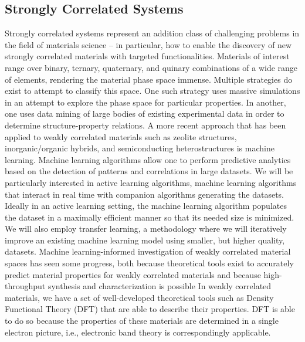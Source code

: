 \documentclass[11pt]{article}
\begin{document}
\subsection{Strongly Correlated Systems}
Strongly correlated systems represent an addition class of challenging
problems in the field of materials science -- in particular, how to
enable the discovery of new strongly correlated materials with
targeted functionalities. Materials of interest range over binary,
ternary, quaternary, and quinary combinations of a wide range of
elements, rendering the material phase space immense.  Multiple
strategies do exist to attempt to classify this space. One such
strategy uses massive simulations in an attempt to explore the phase
space for particular properties. In another, one uses data mining of
large bodies of existing experimental data in order to determine
structure-property relations.  A more recent approach that has been
applied to weakly correlated materials such as zeolite structures,
inorganic/organic hybrids, and semiconducting heterostructures is
machine learning.  Machine learning algorithms allow one to perform
predictive analytics based on the detection of patterns and
correlations in large datasets. We will be particularly interested in
active learning algorithms, machine learning algorithms that interact
in real time with companion algorithms generating the
datasets. Ideally in an active learning setting, the machine learning
algorithm populates the dataset in a maximally efficient manner so
that its needed size is minimized. We will also employ transfer
learning, a methodology where we will iteratively improve an existing
machine learning model using smaller, but higher quality, datasets.
Machine learning-informed investigation of weakly correlated material
spaces has seen some progress, both because theoretical tools exist to
accurately predict material properties for weakly correlated materials
and because high-throughput synthesis and characterization is possible
In weakly correlated materials, we have a set of well-developed
theoretical tools such as Density Functional Theory (DFT) that are
able to describe their properties. DFT is able to do so because the
properties of these materials are determined in a single electron
picture, i.e., electronic band theory is correspondingly applicable.
\end{document}
